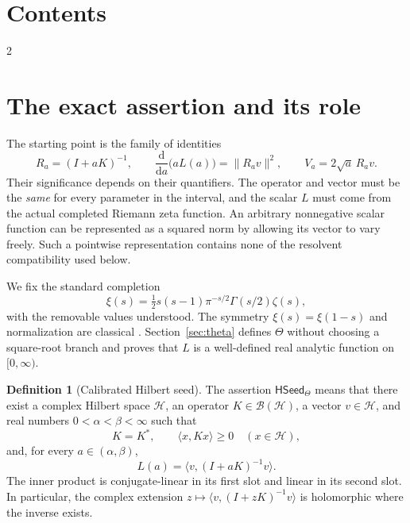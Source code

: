 \documentclass[11pt,a4paper]{article}
\numberwithin{equation}{section}
\theoremstyle{definition}
\newtheorem{definition}[theorem]{Definition}
\theoremstyle{remark}
\newcommand{\HH}{\mathcal H}
\newcommand{\BB}{\mathcal B}
\newcommand{\ip}[2]{\langle #1,#2\rangle}
\newcommand{\norm}[1]{\lVert #1\rVert}
\newcommand{\HSeed}{\mathsf{HSeed}_{\Theta}}
\begin{document}
\section*{Contents}
\begin{multicols}{2}
\small\setlength{\parskip}{0pt}
\makeatletter{}\makeatother
\end{multicols}
\clearpage

\section[Assertion and scope]{The exact assertion and its role}\label{sec:assertion}

The starting point is the family of identities
\begin{equation}\label{eq:anchor-intro}
R_a=(I+aK)^{-1},\qquad
\frac{\mathrm d}{\mathrm da}\bigl(aL(a)\bigr)=\norm{R_av}^{2},\qquad
V_a=2\sqrt a\,R_av.
\end{equation}
Their significance depends on their quantifiers. The operator and vector
must be the \emph{same} for every parameter in the interval, and the scalar
$L$ must come from the actual completed Riemann zeta function. An arbitrary
nonnegative scalar function can be represented as a squared norm by
allowing its vector to vary freely. Such a pointwise representation contains
none of the resolvent compatibility used below.

We fix the standard completion
\begin{equation}\label{eq:xi}
\xi(s)=\tfrac12s(s-1)\pi^{-s/2}\Gamma(s/2)\zeta(s),
\end{equation}
with the removable values understood. The symmetry $\xi(s)=\xi(1-s)$
and normalization are classical \cite{dlmf-reflection}. Section~\ref{sec:theta}
defines $\Theta$ without choosing a square-root branch and proves that
$L$ is a well-defined real analytic function on $[0,\infty)$.

\begin{definition}[Calibrated Hilbert seed]\label{def:hseed}
The assertion $\HSeed$ means that there exist a complex Hilbert space
$\HH$, an operator $K\in\BB(\HH)$, a vector $v\in\HH$, and real numbers
$0<\alpha<\beta<\infty$ such that
\begin{equation}\label{eq:seed-hypotheses}
K=K^*,\qquad \ip{x}{Kx}\geq0\quad(x\in\HH),
\end{equation}
and, for every $a\in(\alpha,\beta)$,
\begin{equation}\label{eq:hseed}
L(a)=\ip{v}{(I+aK)^{-1}v}.
\end{equation}
The inner product is conjugate-linear in its first slot and linear in its
second slot. In particular, the complex extension
$z\mapsto\ip{v}{(I+zK)^{-1}v}$ is holomorphic where the inverse exists.
\end{definition}
\end{document}
